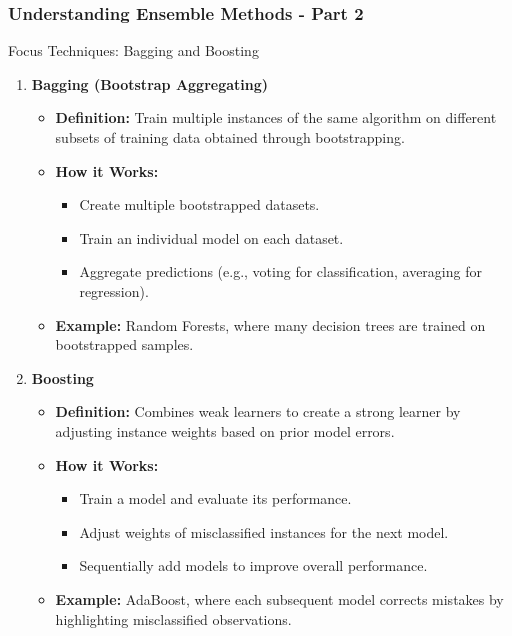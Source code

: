 \documentclass[aspectratio=169]{beamer}
\begin{document}
\begin{frame}[fragile]
    \frametitle{Understanding Ensemble Methods - Part 2}
    \begin{block}{Focus Techniques: Bagging and Boosting}
        \begin{enumerate}
            \item \textbf{Bagging (Bootstrap Aggregating)}
                \begin{itemize}
                    \item \textbf{Definition:} Train multiple instances of the same algorithm on different subsets of training data obtained through bootstrapping.
                    \item \textbf{How it Works:}
                        \begin{itemize}
                            \item Create multiple bootstrapped datasets.
                            \item Train an individual model on each dataset.
                            \item Aggregate predictions (e.g., voting for classification, averaging for regression).
                        \end{itemize}
                    \item \textbf{Example:} Random Forests, where many decision trees are trained on bootstrapped samples.
                \end{itemize}

            \item \textbf{Boosting}
                \begin{itemize}
                    \item \textbf{Definition:} Combines weak learners to create a strong learner by adjusting instance weights based on prior model errors.
                    \item \textbf{How it Works:}
                        \begin{itemize}
                            \item Train a model and evaluate its performance.
                            \item Adjust weights of misclassified instances for the next model.
                            \item Sequentially add models to improve overall performance.
                        \end{itemize}
                    \item \textbf{Example:} AdaBoost, where each subsequent model corrects mistakes by highlighting misclassified observations.
                \end{itemize}
        \end{enumerate}
    \end{block}
\end{frame}
\end{document}
